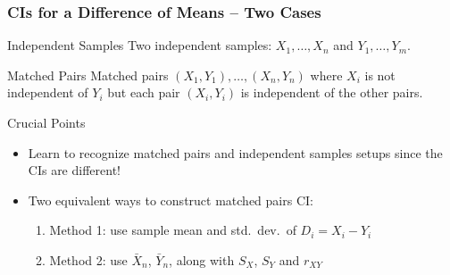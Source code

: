 \begin{frame}
\frametitle{CIs for a Difference of Means -- Two Cases}

\begin{block}{Independent Samples}
 Two independent samples: $X_1, \dots, X_n$ and $Y_1, \dots, Y_m$. 
\end{block}

\begin{block}{Matched Pairs}
 Matched pairs $(X_1, Y_1), \dots, (X_n, Y_n)$ where $X_i$ is \alert{not independent} of $Y_i$ but each pair $(X_i, Y_i)$ is independent of the other pairs. 
\end{block}

\begin{alertblock}{Crucial Points}
\begin{itemize}
	\item Learn to recognize matched pairs and independent samples setups since the CIs are different! 
	\item Two equivalent ways to construct matched pairs CI:
		\begin{enumerate}
			\item Method 1: use sample mean and std.\ dev.\ of $D_i = X_i - Y_i$ 
      \item Method 2: use $\bar{X}_n$, $\bar{Y}_n$, along with $S_X$, $S_Y$ and $r_{XY}$
		\end{enumerate}
\end{itemize}
\end{alertblock}

\end{frame}
